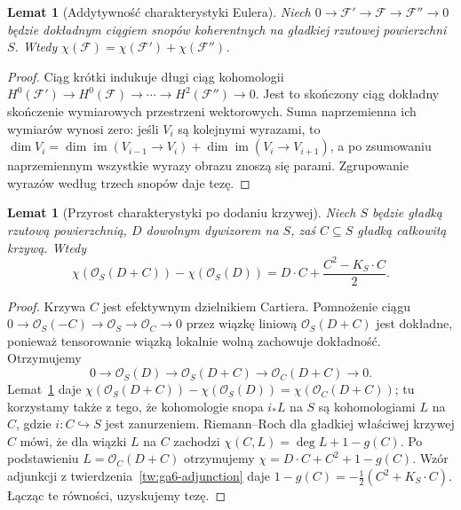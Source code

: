 \documentclass[11pt,a4paper,openany]{report}
\numberwithin{equation}{section}
\theoremstyle{plain}
\newtheorem{lemat}[twierdzenie]{Lemat}
\theoremstyle{definition}
\theoremstyle{remark}
\begin{document}
\begin{lemat}[Addytywność charakterystyki Eulera]
\label{lem:ga7-chi-exact}
Niech $0\to\mathcal F'\to\mathcal F\to\mathcal F''\to0$
będzie dokładnym ciągiem snopów koherentnych na
gładkiej rzutowej powierzchni $S$. Wtedy
$\chi(\mathcal F)=\chi(\mathcal F')+\chi(\mathcal F'')$.
\end{lemat}
\begin{proof}
Ciąg krótki indukuje długi ciąg kohomologii
$H^0(\mathcal F')\to H^0(\mathcal F)\to\cdots
\to H^2(\mathcal F'')\to0$.
Jest to skończony ciąg dokładny skończenie wymiarowych
przestrzeni wektorowych. Suma naprzemienna ich wymiarów
wynosi zero: jeśli $V_i$ są kolejnymi wyrazami, to
$\dim V_i=\dim\operatorname{im}(V_{i-1}\to V_i)+
\dim\operatorname{im}(V_i\to V_{i+1})$, a po zsumowaniu
naprzemiennym wszystkie wyrazy obrazu znoszą się parami.
Zgrupowanie wyrazów według trzech snopów daje tezę.
\end{proof}

\begin{lemat}[Przyrost charakterystyki po dodaniu krzywej]
\label{lem:ga7-rr-increment}
Niech $S$ będzie gładką rzutową powierzchnią,
$D$ dowolnym dywizorem na $S$, zaś $C\subseteq S$
gładką całkowitą krzywą. Wtedy
\[
\chi(\mathcal O_S(D+C))-\chi(\mathcal O_S(D))
= D\cdot C+\frac{C^2-K_S\cdot C}{2}.
\]
\end{lemat}
\begin{proof}
Krzywa $C$ jest efektywnym dzielnikiem Cartiera.
Pomnożenie ciągu
$0\to\mathcal O_S(-C)\to\mathcal O_S\to\mathcal O_C\to0$
przez wiązkę liniową $\mathcal O_S(D+C)$ jest dokładne,
ponieważ tensorowanie wiązką lokalnie wolną zachowuje
dokładność. Otrzymujemy
\[
0\longrightarrow\mathcal O_S(D)
\longrightarrow\mathcal O_S(D+C)
\longrightarrow\mathcal O_C(D+C)\longrightarrow0.
\]
Lemat~\ref{lem:ga7-chi-exact} daje
$\chi(\mathcal O_S(D+C))-\chi(\mathcal O_S(D))
=\chi(\mathcal O_C(D+C))$; tu korzystamy także z tego,
że kohomologie snopa $i_*L$ na $S$ są kohomologiami
$L$ na $C$, gdzie $i:C\hookrightarrow S$ jest zanurzeniem.
Riemann--Roch dla gładkiej właściwej krzywej
$C$ mówi, że dla wiązki $L$ na $C$ zachodzi
$\chi(C,L)=\deg L+1-g(C)$. Po podstawieniu
$L=\mathcal O_C(D+C)$ otrzymujemy
$\chi= D\cdot C+C^2+1-g(C)$.
Wzór adjunkcji z twierdzenia~\ref{tw:ga6-adjunction}
daje $1-g(C)=-\frac12(C^2+K_S\cdot C)$.
Łącząc te równości, uzyskujemy tezę.
\end{proof}
\end{document}
